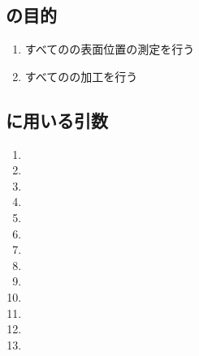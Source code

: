 \subsection{\DLone の目的}
\begin{enumerate}[label*=\sarrow]
\item すべての\Dimple の表面位置の測定を行う
\item すべての\Dimple の加工を行う
\end{enumerate}


\subsection{\DLone に用いる引数}
\begin{enumerate}[label*=\sarrow]
\item \PMAlocationAngle
\item \PMDimpleAngle
\item \PMDimpleHorizontalPitch
\item \PMDimpleVerticalPitch
\item \PMDimpleOddRowLength
\item \PMDimpleRowNum
\item \PMDistanceTopEndFaceDimpleFirstRow
\item \PMCenterCurvatureRadius
\item \PMDimpleEvenRowLength
\item \PMPlatingThk
\item \PMDimpleDepth
\item \PMTopAlocationLength
\item \PMTopReAlocationLength
\end{enumerate}




